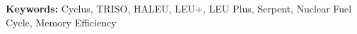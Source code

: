 


\textbf{Keywords:} Cyclus, TRISO, HALEU, LEU+, LEU Plus, Serpent, Nuclear Fuel Cycle, Memory Efficiency